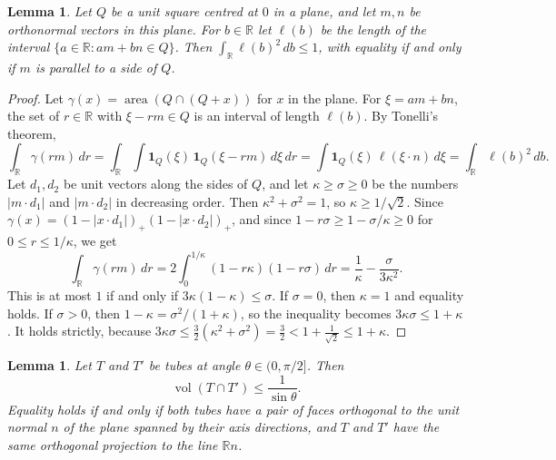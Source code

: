 \documentclass[11pt]{amsart}
\newtheorem{lemma}[theorem]{Lemma}
\theoremstyle{definition}
\theoremstyle{remark}
\numberwithin{equation}{section}
\newcommand{\R}{\mathbb{R}}
\newcommand{\vol}{\operatorname{vol}}
\newcommand{\area}{\operatorname{area}}
\newcommand{\one}{\mathbf{1}}
\begin{document}
\begin{lemma}\label{lem:chord}
Let $Q$ be a unit square centred at $0$ in a plane, and let $m,n$ be orthonormal vectors in this plane. For $b\in\R$ let $\ell(b)$ be the length of the interval $\{a\in\R:am+bn\in Q\}$. Then $\int_\R\ell(b)^2\,db\le1$, with equality if and only if $m$ is parallel to a side of $Q$.
\end{lemma}

\begin{proof}
Let $\gamma(x)=\area(Q\cap(Q+x))$ for $x$ in the plane. For $\xi=am+bn$, the set of $r\in\R$ with $\xi-rm\in Q$ is an interval of length $\ell(b)$. By Tonelli's theorem,
\[
\int_\R\gamma(rm)\,dr=\int_\R\int\one_Q(\xi)\,\one_Q(\xi-rm)\,d\xi\,dr=\int\one_Q(\xi)\,\ell(\xi\cdot n)\,d\xi=\int_\R\ell(b)^2\,db.
\]
Let $d_1,d_2$ be unit vectors along the sides of $Q$, and let $\kappa\ge\sigma\ge0$ be the numbers $|m\cdot d_1|$ and $|m\cdot d_2|$ in decreasing order. Then $\kappa^2+\sigma^2=1$, so $\kappa\ge1/\sqrt2$. Since $\gamma(x)=(1-|x\cdot d_1|)_+(1-|x\cdot d_2|)_+$, and since $1-r\sigma\ge1-\sigma/\kappa\ge0$ for $0\le r\le1/\kappa$, we get
\[
\int_\R\gamma(rm)\,dr=2\int_0^{1/\kappa}(1-r\kappa)(1-r\sigma)\,dr=\frac1\kappa-\frac{\sigma}{3\kappa^2}.
\]
This is at most $1$ if and only if $3\kappa(1-\kappa)\le\sigma$. If $\sigma=0$, then $\kappa=1$ and equality holds. If $\sigma>0$, then $1-\kappa=\sigma^2/(1+\kappa)$, so the inequality becomes $3\kappa\sigma\le1+\kappa$. It holds strictly, because $3\kappa\sigma\le\frac32(\kappa^2+\sigma^2)=\frac32<1+\frac1{\sqrt2}\le1+\kappa$.
\end{proof}

\begin{lemma}\label{lem:twotube}
Let $T$ and $T'$ be tubes at angle $\theta\in(0,\pi/2]$. Then
\[
\vol(T\cap T')\le\frac1{\sin\theta}.
\]
Equality holds if and only if both tubes have a pair of faces orthogonal to the unit normal $n$ of the plane spanned by their axis directions, and $T$ and $T'$ have the same orthogonal projection to the line $\R n$.
\end{lemma}
\end{document}
